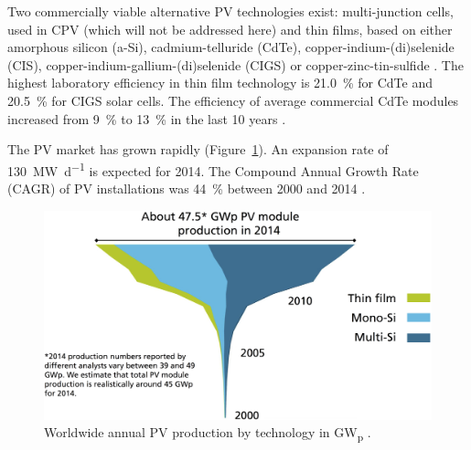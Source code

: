 Two commercially viable alternative \ac{PV} technologies exist: multi-junction cells, used in \ac{CPV} (which will not be addressed here) and thin films, based on either amorphous silicon (a-Si), cadmium-telluride (CdTe), copper-indium-(di)selenide (CIS), copper-indium-gallium-(di)selenide (CIGS) or copper-zinc-tin-sulfide \cite{IEA2014c}. The highest laboratory efficiency in thin film technology is \SI{21.0}{\percent} for CdTe and \SI{20.5}{\percent} for CIGS solar cells. The efficiency of average commercial CdTe modules increased from \SI{9}{\percent} to \SI{13}{\percent} in the last 10 years \cite{FraunhoferISE2015}.


The \ac{PV} market has grown rapidly (Figure~\ref{PV_Prod_by_Tech}). An expansion rate of \SI{130}{\mega\watt\per\day} is expected for 2014. The Compound Annual Growth Rate (CAGR) of \ac{PV} installations was \SI{44}{\percent} between 2000 and 2014 \cite{FraunhoferISE2015}. 


\begin{figure}[htbp]  
\centering
\includegraphics[width=0.7\linewidth]{FIG/PV_Prod_by_Tech}
\caption[Worldwide annual PV production by technology.]{Worldwide annual PV production by technology in \si{\giga\watt}\textsubscript{p} \cite{FraunhoferISE2015}.}\label{PV_Prod_by_Tech}
\end{figure}

